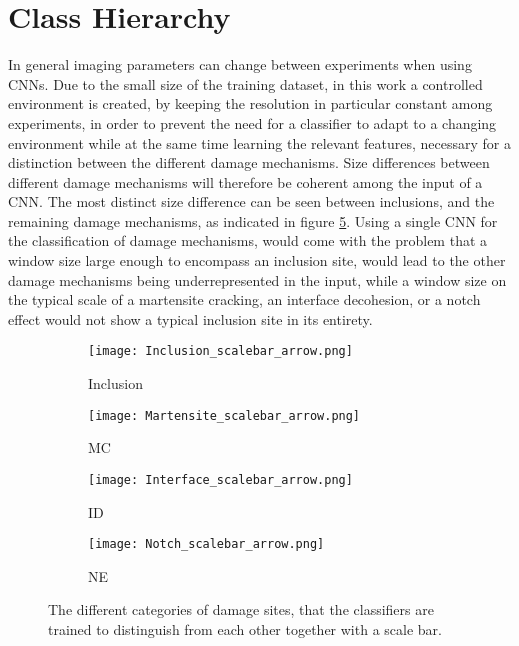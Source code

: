 \section{Class Hierarchy}

In general imaging parameters can change between experiments when using CNNs. Due to the small size of the training dataset, in this work a controlled environment is created, by keeping the resolution in particular constant among experiments, in order to prevent the need for a classifier to adapt to a changing environment while at the same time learning the relevant features, necessary for a distinction between the different damage mechanisms. Size differences between different damage mechanisms will therefore be coherent among the input of a CNN. The most distinct size difference can be seen between inclusions, and the remaining damage mechanisms, as indicated in figure \ref{fig:SizeDifference}. Using a single CNN for the classification of damage mechanisms, would come with the problem that a window size large enough to encompass an inclusion site, would lead to the other damage mechanisms being underrepresented in the input, while a window size on the typical scale of a martensite cracking, an interface decohesion, or a notch effect would not show a typical inclusion site in its entirety. \\

\begin{figure}[H]
\centering
\begin{subfigure}{.25\textwidth}
\centering
  \texttt{[image: Inclusion\_scalebar\_arrow.png]}
  \caption{Inclusion}
  \label{fig:Inclusion_scalebar}
\end{subfigure}%
\begin{subfigure}{.25\textwidth}
\centering
  \texttt{[image: Martensite\_scalebar\_arrow.png]}
  \caption{MC}
  \label{fig:Martensite_scalebar}
\end{subfigure}%
\begin{subfigure}{.25\textwidth}
\centering
  \texttt{[image: Interface\_scalebar\_arrow.png]}
  \caption{ID}
  \label{fig:Interface_scalebar}
\end{subfigure}%
\begin{subfigure}{.25\textwidth}
\centering
  \texttt{[image: Notch\_scalebar\_arrow.png]}
  \caption{NE}
  \label{fig:Notch_scalebar}
\end{subfigure}%
\caption{The different categories of damage sites, that the classifiers are trained to distinguish from each other together with a scale bar.}
\label{fig:SizeDifference}
\end{figure}

